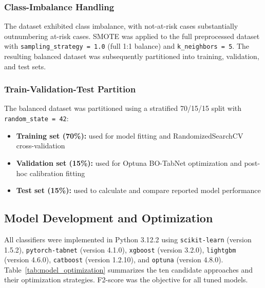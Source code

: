 \subsubsection{Class-Imbalance Handling}

The dataset exhibited class imbalance, with not-at-risk cases substantially outnumbering at-risk cases. SMOTE \cite{elreedy_smote_2023} was applied to the full preprocessed dataset with \texttt{sampling\_strategy = 1.0} (full 1:1 balance) and \texttt{k\_neighbors = 5}. The resulting balanced dataset was subsequently partitioned into training, validation, and test sets.

\subsubsection{Train-Validation-Test Partition}

The balanced dataset was partitioned using a stratified 70/15/15 split with \texttt{random\_state = 42}:

\begin{itemize}
    \item \textbf{Training set (70\%):} used for model fitting and RandomizedSearchCV cross-validation
    \item \textbf{Validation set (15\%):} used for Optuna BO-TabNet optimization and post-hoc calibration fitting
    \item \textbf{Test set (15\%):} used to calculate and compare reported model performance
\end{itemize}

\subsection{Model Development and Optimization}

All classifiers were implemented in Python 3.12.2 using \texttt{scikit-learn} (version 1.5.2), \texttt{pytorch-tabnet} (version 4.1.0), \texttt{xgboost} (version 3.2.0), \texttt{lightgbm} (version 4.6.0), \texttt{catboost} (version 1.2.10), and \texttt{optuna} (version 4.8.0). Table~\ref{tab:model_optimization} summarizes the ten candidate approaches and their optimization strategies. F2-score was the objective for all tuned models.

